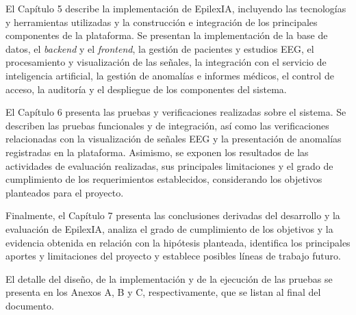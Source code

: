 El Capítulo 5 describe la implementación de EpilexIA, incluyendo las
tecnologías y herramientas utilizadas y la construcción e integración de los
principales componentes de la plataforma. Se presentan la implementación de la
base de datos, el \textit{backend} y el \textit{frontend}, la gestión de pacientes y estudios
EEG, el procesamiento y visualización de las señales, la integración con el
servicio de inteligencia artificial, la gestión de anomalías e informes
médicos, el control de acceso, la auditoría y el despliegue de los componentes
del sistema.

El Capítulo 6 presenta las pruebas y verificaciones realizadas sobre
el sistema. Se describen las pruebas funcionales y de integración,
así como las verificaciones relacionadas con la visualización de
señales EEG y la presentación de anomalías registradas en la
plataforma. Asimismo, se exponen los resultados de las actividades
de evaluación realizadas, sus principales limitaciones y el grado
de cumplimiento de los requerimientos establecidos, considerando
los objetivos planteados para el proyecto.

Finalmente, el Capítulo 7 presenta las conclusiones derivadas del
desarrollo y la evaluación de EpilexIA, analiza el grado de
cumplimiento de los objetivos y la evidencia obtenida en relación
con la hipótesis planteada, identifica los principales aportes
y limitaciones del proyecto y establece posibles líneas de
trabajo futuro.

\begin{nuevotexto}
El detalle del diseño, de la implementación y de la ejecución de las pruebas se presenta en los Anexos A, B y C, respectivamente, que se listan al final del documento.
\end{nuevotexto}

